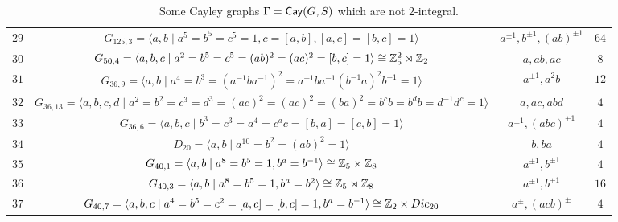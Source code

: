 \documentclass{amsart}
\def\Cay{{\sf Cay}} \def\Ker{{\sf Ker}}
\begin{document}
{\begin{table}
\begin{tabular}{|c|c|c|c|}
			$29$&$G_{125,3}=\langle a,b\mid a^5=b^5=c^5=1,c=[a,b], [a,c]=[b,c]=1\rangle$&$a^{\pm 1},b^{\pm 1},(ab)^{\pm 1}$&$64$\\%
			$30$&$G_{50,4}=\langle a,b,c\mid a^2=b^5=c^5=(ab)^2=(ac)^2=[b,c]=1\rangle\cong\Bbb Z_5^2\rtimes\Bbb Z_2$&$a,ab,ac$&$8$\\%
			$31$&$G_{36,9}=\langle a,b\mid a^4=b^3=(a^{-1}ba^{-1})^2=a^{-1}ba^{-1}(b^{-1}a)^2b^{-1}=1\rangle$&$a^{\pm 1},a^2b$&$12$\\%
			$32$&$G_{36,13}=\langle a,b,c,d\mid a^2=b^2=c^3=d^3=(ac)^2=(ac)^2=(ba)^2=b^cb= b^db=d^{-1}d^c=1\rangle$&$a,ac,abd$&$4$\\%
			$33$&$G_{36,6}=\langle  a,b,c\mid b^3=c^3=a^4=c^ac=[b,a]=[c,b]=1\rangle$&$ a^{\pm 1}, (abc)^{\pm 1}$&$4$\\%
			$34$&$D_{20}=\langle a,b\mid a^{10}=b^2=(ab)^2=1\rangle$&$b,ba$&$4$\\
			$35$&$G_{40,1}=\langle a,b\mid a^8=b^5=1, b^a=b^{-1}\rangle\cong\Bbb Z_5\rtimes\Bbb Z_8$&$a^{\pm 1}, b^{\pm 1}$&$4$\\
			$36$&$G_{40,3}=\langle a,b\mid a^8=b^5=1, b^a=b^{2}\rangle\cong\Bbb Z_5\rtimes\Bbb Z_8$&$a^{\pm 1}, b^{\pm 1}$&$16$\\
			$37$&$G_{40,7}=\langle a,b,c\mid a^4=b^5=c^2=[a,c]=[b,c]=1, b^a=b^{-1}\rangle\cong\Bbb Z_2\times Dic_{20}$&$a^{\pm}, (acb)^{\pm}$&$4$\\
			  \hline
			
			
			
			
			
		\end{tabular}
		\vspace{0.1cm}
		\caption{Some Cayley graphs $\Gamma=\Cay(G,S)$ which are not $2$-integral.}\label{Table23}
		
	\end{table}
}
\end{document}
